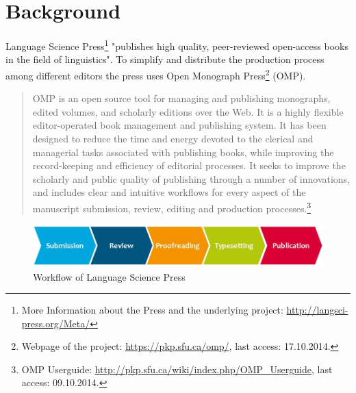 




 
\chapter{Background} \label{sec:intro}

Language Science Press\footnote{More Information about the Press and the underlying project: \url{http://langsci-press.org/Meta/}} "publishes high quality, peer-reviewed open-access books in the field of linguistics". To simplify and distribute the production process among different editors the press uses Open Monograph Press\footnote{Webpage of the project: \url{https://pkp.sfu.ca/omp/}, last access: 17.10.2014.} (OMP).

\begin{quote}
OMP is an open source tool for managing and publishing monographs, edited volumes, and scholarly editions over the Web. It is a highly flexible editor-operated book management and publishing system. It has been designed to reduce the time and energy devoted to the clerical and managerial tasks associated with publishing books, while improving the record-keeping and efficiency of editorial processes. It seeks to improve the scholarly and public quality of publishing through a number of innovations, and includes clear and intuitive workflows for every aspect of the manuscript submission, review, editing and production processes.\footnote{OMP Userguide: \url{http://pkp.sfu.ca/wiki/index.php/OMP_Userguide}, last access: 09.10.2014.}
\end{quote}

\begin{figure}[h] \centering
\includegraphics[width=1\textwidth]{./img/workflow.jpg}
\caption{Workflow of Language Science Press}
\label{fig:workflow}
\end{figure}

